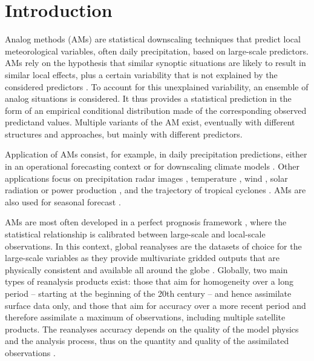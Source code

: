 \documentclass[alpha-refs]{wiley-article}
\begin{document}
\linenumbers

\section{Introduction}

Analog methods (AMs) are statistical downscaling techniques that predict local meteorological variables, often daily precipitation, based on large-scale predictors. AMs rely on the hypothesis that similar synoptic situations are likely to result in similar local effects, plus a certain variability that is not explained by the considered predictors \citep{Lorenz1969}. To account for this unexplained variability, an ensemble of analog situations is considered. It thus provides a statistical prediction in the form of an empirical conditional distribution made of the corresponding observed predictand values. Multiple variants of the AM exist, eventually with different structures and approaches, but mainly with different predictors.

Application of AMs consist, for example, in daily precipitation predictions, either in an operational forecasting context \citep[e.g.][]{Bontron2005, Hamill2006, Bliefernicht2010, Marty2012, Horton2012, Hamill2015, BenDaoud2016} or for downscaling climate models \citep[e.g.][]{Zorita1999, Wetterhall2005, Wetterhall2007, Matulla2007, Radanovics2013, Chardon2014, Dayon2015, Raynaud2016b}. Other applications focus on precipitation radar images \citep{Panziera2011, Foresti2015a}, temperature \citep{Kruizinga1983, DelleMonache2013, Caillouet2016, Raynaud2016b}, wind \citep{DelleMonache2013, DelleMonache2011, Vanvyve2015, Alessandrini2015, Junk2015, Junk2015c}, solar radiation or power production \citep{Alessandrini2015a, Bessa2015, Raynaud2016b}, and the trajectory of tropical cyclones \citep{Sievers2000, Fraedrich2003}. AMs are also used for seasonal forecast \citep{Xavier2007, Charles2012, Wu2012, Shao2013}.

AMs are most often developed in a perfect prognosis framework \citep{Rummukainen1997, Maraun2010}, where the statistical relationship is calibrated between large-scale and local-scale observations. In this context, global reanalyses are the datasets of choice for the large-scale variables as they provide multivariate gridded outputs that are physically consistent and available all around the globe \citep{Gelaro2017}. Globally, two main types of reanalysis products exist: those that aim for homogeneity over a long period -- starting at the beginning of the 20th century -- and hence assimilate surface data only, and those that aim for accuracy over a more recent period and therefore assimilate a maximum of observations, including multiple satellite products. The reanalyses accuracy depends on the quality of the model physics and the analysis process, thus on the quantity and quality of the assimilated observations \citep{Dee2011a}.
\end{document}
